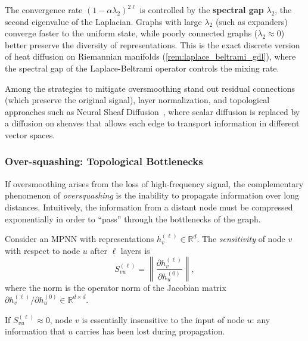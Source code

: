 \begin{remark}\label{rem:oversmoothing_geometrico}
	The convergence rate $(1-\alpha\lambda_2)^{2\ell}$ is controlled by the \textbf{spectral gap} $\lambda_2$, the second eigenvalue of the Laplacian. Graphs with large $\lambda_2$ (such as expanders) converge faster to the uniform state, while poorly connected graphs ($\lambda_2 \approx 0$) better preserve the diversity of representations. This is the exact discrete version of heat diffusion on Riemannian manifolds (\autoref{rem:laplace_beltrami_gdl}), where the spectral gap of the Laplace-Beltrami operator controls the mixing rate.

	Among the strategies to mitigate \gls{oversmoothing} stand out residual connections (which preserve the original signal), layer normalization, and topological approaches such as Neural Sheaf Diffusion~\citep{bodnar2022neural}, where scalar diffusion is replaced by a diffusion on sheaves that allows each edge to transport information in different vector spaces.
\end{remark}

\subsubsection{Over-squashing: Topological Bottlenecks}\label{subsubsec:oversquashing}

If \gls{oversmoothing} arises from the loss of high-frequency signal, the complementary phenomenon of \textit{\gls{oversquashing}} is the inability to propagate information over long distances. Intuitively, the information from a distant node must be compressed exponentially in order to ``pass'' through the bottlenecks of the graph.

\begin{definition}\label{def:sensibilidad_mpnn}
	Consider an \gls{MPNN} with representations $h_v^{(\ell)} \in \mathbb{R}^d$. The \textit{sensitivity} of node $v$ with respect to node $u$ after $\ell$ layers is
	\[
		S_{vu}^{(\ell)} = \left\|\frac{\partial h_v^{(\ell)}}{\partial h_u^{(0)}}\right\|,
	\]
	where the norm is the operator norm of the Jacobian matrix $\partial h_v^{(\ell)} / \partial h_u^{(0)} \in \mathbb{R}^{d \times d}$.
\end{definition}

If $S_{vu}^{(\ell)} \approx 0$, node $v$ is essentially insensitive to the input of node $u$: any information that $u$ carries has been lost during propagation.

